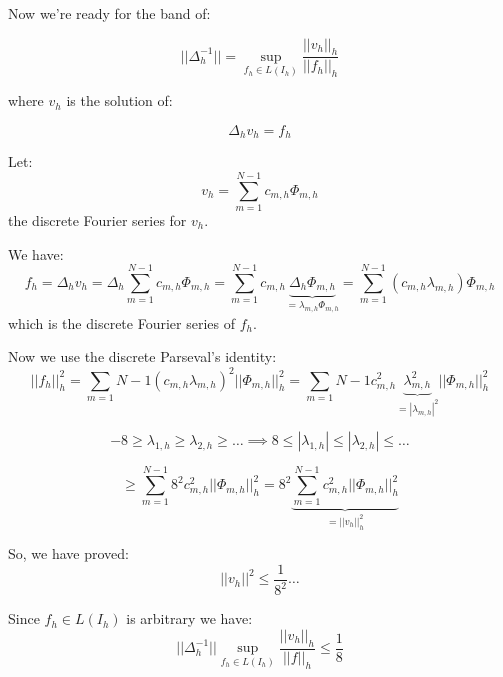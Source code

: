 Now we're ready for the band of:

\begin{equation*}
||\Delta_h^{-1} || = \sup_{f_h \in L(I_h)} \frac{||v_h||_h}{||f_h||_h}
\end{equation*}

where $v_h$ is the solution of:

\begin{equation*}
\Delta_h v_h = f_h
\end{equation*}

Let:
\begin{equation*}
v_h = \sum_{m=1}^{N-1} c_{m,h} \Phi_{m,h}
\end{equation*}
the discrete Fourier series for $v_h$.

We have:
\begin{equation*}
f_h = \Delta_h v_h = \Delta_h \sum_{m=1}^{N-1} c_{m,h} \Phi_{m,h} = \sum_{m=1}^{N-1} c_{m,h} \underbrace{\Delta_h\Phi_{m,h}}_{= \lambda_{m, h}\Phi_{m,h}} = \sum_{m=1}^{N-1} (c_{m,h} \lambda_{m, h}) \Phi_{m,h}
\end{equation*}
which is the discrete Fourier series of $f_h$.

Now we use the discrete Parseval's identity:
\begin{equation*}
||f_h||_h^2 = \sum_{m=1}{N-1} (c_{m,h} \lambda_{m,h})^2 ||\Phi_{m,h}||_h^2 = \sum_{m=1}{N-1} c_{m,h}^2 \underbrace{\lambda_{m,h}^2}_{= |\lambda_{m,h}|^2} ||\Phi_{m,h}||_h^2
\end{equation*}

\begin{equation*}
-8 \ge \lambda_{1,h} \ge \lambda_{2,h} \ge \dots \implies 8 \le |\lambda_{1,h}| \le |\lambda_{2,h}| \le \dots 
\end{equation*}

\begin{equation*}
\ge \sum_{m=1}^{N-1} 8^2 c_{m,h}^2 ||\Phi_{m,h}||_h^2 = 8^2 \underbrace{\sum_{m=1}^{N-1} c_{m,h}^2 ||\Phi_{m,h}||_h^2}_{= ||v_h||_h^2}
\end{equation*}

So, we have proved:
\begin{equation*}
||v_h||^2 \le \frac{1}{8^2} \dots
\end{equation*}

Since $f_h \in L(I_h)$ is arbitrary we have:
\begin{equation*}
||\Delta_h^{-1}|| \sup_{f_h \in L(I_h)} \frac{||v_h||_h}{||f||_h} \le \frac{1}{8}
\end{equation*}

